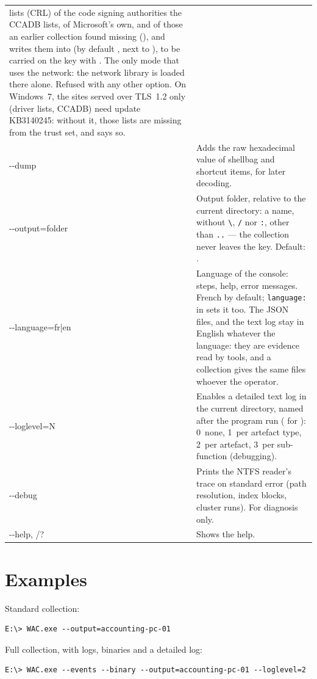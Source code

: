 \documentclass[11pt,a4paper,oneside]{report}
\begin{document}
\begin{longtable}{@{}>{\ttfamily}L{3.2cm}L{11.2cm}@{}}
  lists (CRL) of the code signing authorities the CCADB lists, of Microsoft's
  own, and of those an earlier collection found missing
  (), and writes them into  (by default
  , next to ), to be carried on the key with
  . The only mode that uses the network: the network library
  is loaded there alone. Refused with any other option. On Windows~7, the
  sites served over TLS~1.2 only (driver lists, CCADB) need update
  KB3140245: without it, those lists are missing from the trust set, and
   says so. \\
-{}-dump & Adds the raw hexadecimal value of shellbag and  shortcut
  items, for later decoding. \\
-{}-output=folder & Output folder, relative to the current directory: a name,
  without \texttt{\textbackslash}, \texttt{/} nor \texttt{:}, other than
  \texttt{..} --- the collection never leaves the key. Default:
  . \\
-{}-language=fr|en & Language of the console: steps, help, error messages.
  French by default; \texttt{language:} in  sets it too. The
  JSON files,  and the text log stay in English
  whatever the language: they are evidence read by tools, and a collection
  gives the same files whoever the operator. \\
-{}-loglevel=N & Enables a detailed text log in the current directory, named
  after the program run ( for ): 0~none,
  1~per artefact type, 2~per artefact, 3~per sub-function (debugging). \\
-{}-debug & Prints the NTFS reader's trace on standard error (path resolution,
  index blocks, cluster runs). For diagnosis only. \\
-{}-help, /? & Shows the help. \\
\bottomrule
\end{longtable}

\section{Examples}

Standard collection:
\begin{lstlisting}
E:\> WAC.exe --output=accounting-pc-01
\end{lstlisting}

Full collection, with logs, binaries and a detailed log:
\begin{lstlisting}
E:\> WAC.exe --events --binary --output=accounting-pc-01 --loglevel=2
\end{lstlisting}
\end{document}
